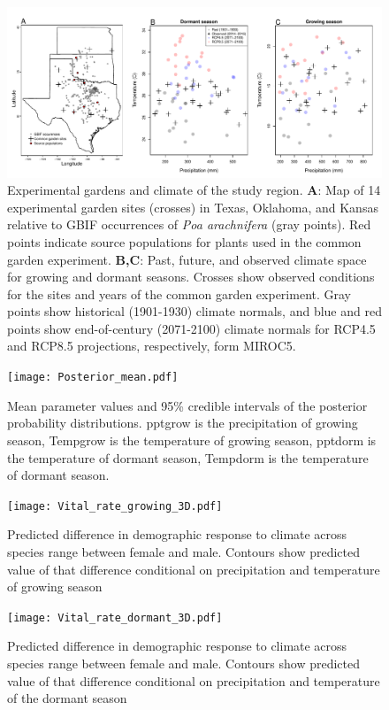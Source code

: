 \documentclass[9pt,twoside,lineno]{pnas-new}
\begin{document}
\begin{figure}
\centering
\includegraphics[width=\textwidth]{tom_map_v2.pdf}
\caption{ Experimental gardens and climate of the study region. 
  	\textbf{A}: Map of 14 experimental garden sites (crosses) in Texas, Oklahoma, and Kansas relative to GBIF occurrences of \textit{Poa arachnifera} (gray points). Red points indicate source populations for plants used in the common garden experiment. 
  	\textbf{B,C}: Past, future, and observed climate space for growing and dormant seasons. Crosses show observed conditions for the sites and years of the common garden experiment. Gray points show historical (1901-1930) climate normals, and blue and red points show end-of-century (2071-2100) climate normals for RCP4.5 and RCP8.5 projections, respectively, form MIROC5.
}
\label{Sup:climate_variation1}
\end{figure}
\clearpage

\begin{figure}
\centering
\texttt{[image: Posterior\_mean.pdf]}
\caption{Mean parameter values and 95\% credible intervals of the posterior probability distributions. 
		pptgrow is  the precipitation of growing season,
		Tempgrow is the temperature of growing season,
		pptdorm is the temperature of dormant season,
		Tempdorm is the temperature of dormant season.}
\label{Sup:Posterior}
\end{figure}
\clearpage

\begin{figure}
\centering
\texttt{[image: Vital\_rate\_growing\_3D.pdf]}
\caption{ Predicted difference in demographic response to climate across species range between female and male. Contours show predicted value of that difference conditional on precipitation and temperature of  growing season }
\label{Sup:vt_3D_grow}
\end{figure}
\clearpage

\begin{figure}
\centering
\texttt{[image: Vital\_rate\_dormant\_3D.pdf]}
\caption{ Predicted difference in demographic response to climate across species range between female and male. Contours show predicted value of that difference conditional on precipitation and temperature of the dormant  season }
\label{Sup:vt_3D_dorm}
\end{figure}
\clearpage
\end{document}
